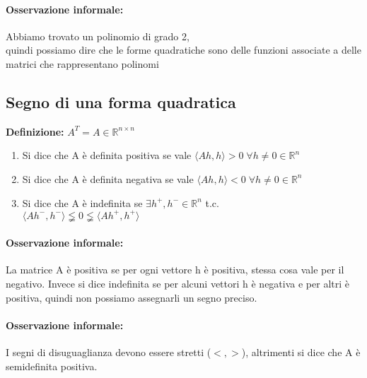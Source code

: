 \documentclass[12pt]{article}
\newcommand {\R}{\mathbb{R}}
\begin{document}
\paragraph*{Osservazione informale:}
Abbiamo trovato un polinomio di grado 2,\\
quindi possiamo dire che le forme quadratiche sono delle funzioni
associate a delle matrici che rappresentano polinomi


\subsection{Segno di una forma quadratica}

\textbf{Definizione:} $A^T = A \in \R^{n\times n}$

\begin{enumerate}
    \item Si dice che A è definita positiva se vale $\langle Ah, h\rangle > 0\; \forall h \neq 0 \in \R ^n$
    \item Si dice che A è definita negativa se vale $\langle Ah, h\rangle < 0\; \forall h \neq 0 \in \R ^n$
    \item Si dice che A è indefinita se $\exists h^+, h^- \in \R ^n$ t.c. \\$\langle Ah^-,h^-\rangle  \lneqq 0 \lneqq \langle Ah^+,h^+ \rangle$
\end{enumerate}

\paragraph*{Osservazione informale:}
La matrice A è positiva se per ogni vettore h è positiva, stessa cosa vale per il negativo.
Invece si dice indefinita se per alcuni vettori h è negativa e per altri è positiva,
quindi non possiamo assegnarli un segno preciso.

\paragraph*{Osservazione informale:}
I segni di disuguaglianza devono essere stretti ($<, >$),
altrimenti si dice che A è semidefinita positiva.\\
\end{document}
